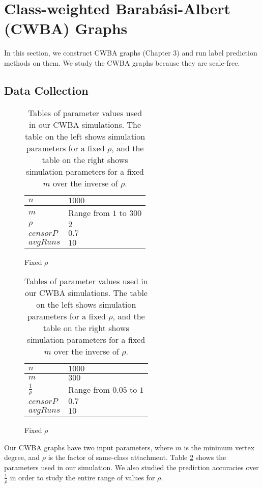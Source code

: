 \section{Class-weighted Barab\'{a}si-Albert (CWBA) Graphs}
In this section, we construct CWBA graphs (Chapter 3) and run label
prediction methods on them. We study the CWBA graphs because they are
scale-free.

\subsection{Data Collection}

\begin{table}[H]
\centering
\begin{subfigure}[h]{0.4\linewidth}
\begin{tabular}{|l|l|}
\hline
$n$ & $1000$ \\ \hline
$m$ & Range from $1$ to $300$\\ \hline
$\rho$ & $2$\\ \hline
$censorP$ & $0.7$\\ \hline
$avgRuns$ & $10$\\ \hline
\end{tabular}
\caption{Fixed $\rho$}
\end{subfigure}
\hfill
\begin{subfigure}[h]{0.4\linewidth}
\begin{tabular}{|l|l|}
\hline
$n$ & $1000$ \\ \hline
$m$ & $300$\\ \hline
$\frac{1}{\rho}$ & Range from $0.05$ to $1$\\ \hline
$censorP$ & $0.7$\\ \hline
$avgRuns$ & $10$\\ \hline
\end{tabular}
\caption{Fixed $\rho$}
\end{subfigure}%
\caption{Tables of parameter values used in our CWBA simulations. The table
on the left shows simulation parameters for a fixed $\rho$, and the table
on the right shows simulation parameters for a fixed $m$ over the inverse of $\rho$.}
\label{table:CWBA-params}
\end{table}

Our CWBA graphs have two input parameters, where $m$ is the minimum vertex
degree, and $\rho$ is the factor of same-class attachment. Table
\ref{table:CWBA-params} shows the parameters used in our simulation. We
also studied the prediction accuracies over $\frac{1}{\rho}$ in order to
study the entire range of values for $\rho$.

